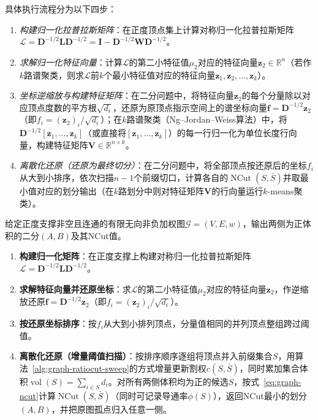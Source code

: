 具体执行流程分为以下四步：
\begin{enumerate}
\item \emph{构建归一化拉普拉斯矩阵}：在正度顶点集上计算对称归一化拉普拉斯矩阵$\mathcal L = \bm D^{-1/2}\bm L\bm D^{-1/2} = \bm I - \bm D^{-1/2}\bm W\bm D^{-1/2}$。
\item \emph{求解归一化特征向量}：计算$\mathcal L$的第二小特征值$\mu_2$对应的特征向量$\bm z_2\in\mathbb R^n$（若作$k$路谱聚类，则求$\mathcal L$前$k$个最小特征值对应的特征向量$\bm z_1,\bm z_2,\ldots,\bm z_k$）。
\item \emph{坐标逆缩放与构建特征矩阵}：在二分问题中，将特征向量$\bm z_2$的每个分量除以对应顶点度数的平方根$\sqrt{d_i}$，还原为原顶点指示空间上的谱坐标向量$\bm f=\bm D^{-1/2}\bm z_2$（即$f_i=(\bm z_2)_i/\sqrt{d_i}$）；在$k$路谱聚类（Ng--Jordan--Weiss算法）中，将$\bm D^{-1/2}[\bm z_1,\ldots,\bm z_k]$（或直接将$[\bm z_1,\ldots,\bm z_k]$）的每一行归一化为单位长度行向量，构建特征矩阵$\bm V\in\mathbb R^{n\times k}$。
\item \emph{离散化还原（还原为最终切分）}：在二分问题中，将全部顶点按还原后的坐标$f_i$从大到小排序，依次扫描$n-1$个前缀切口，计算各自的$\operatorname{NCut}(S,\bar S)$并取最小值对应的划分输出（在$k$路划分中则对特征矩阵$\bm V$的行向量运行$k$-means聚类）。
\end{enumerate}

\begin{algorithm}[NCut谱划分]
\label{alg:graph-ncut-sweep}
给定正度支撑非空且连通的有限无向非负加权图$\mathcal G=(V,E,w)$，输出两侧为正体积的二分$(A,B)$及其NCut值。
\begin{enumerate}
\item \textbf{构建归一化矩阵}：在正度支撑上构建对称归一化拉普拉斯矩阵$\mathcal L=\bm D^{-1/2}\bm L\bm D^{-1/2}$。
\item \textbf{求解特征向量并还原坐标}：求$\mathcal L$的第二小特征值$\mu_2$对应的特征向量$\bm z_2$，作逆缩放还原$\bm f=\bm D^{-1/2}\bm z_2$（即$f_i=(\bm z_2)_i/\sqrt{d_i}$）。
\item \textbf{按还原坐标排序}：按$f_i$从大到小排列顶点，分量值相同的并列顶点整组跨过阈值。
\item \textbf{离散化还原（增量阈值扫描）}：按排序顺序逐组将顶点并入前缀集合$S$，用算法~\ref{alg:graph-ratiocut-sweep}的方式增量更新割权$c(S,\bar S)$，同时累加集合体积$\operatorname{vol}(S)=\sum_{i\in S}d_i$。对所有两侧体积均为正的候选$S$，按式~\eqref{eq:graph-ncut}计算$\operatorname{NCut}(S,\bar S)$（同时可记录导通率$\phi(S)$），返回NCut最小的划分$(A,B)$，并把原图孤点归入任意一侧。
\end{enumerate}
\end{algorithm}

